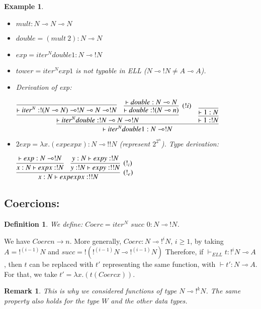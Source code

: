 \documentclass[a4paper,10pt]{article}
\newcommand{\limpl}{\multimap}  %
\newtheorem{definition}{Definition}
\newtheorem{ex}{Example}
\newtheorem{rmk}{Remark}
\begin{document}
\begin{ex}
\begin{itemize}
\item $mult: N \limpl N \limpl N$
\item $double=(mult\ 2): N \limpl N$
\item $exp=iter^N double 1: N \limpl !N$
\item $tower=iter^N exp 1$ is not typable in ELL ($N\limpl !N \neq A\limpl A$).
\item Derivation of exp:
\begin{center}
$	\infer{\vdash iter^N double 1: N \limpl !N}{
		\infer{\vdash iter^N double: !N \limpl N \limpl !N}{
			\infer{\vdash iter^N: !(N\limpl N) \limpl !N \limpl N \limpl !N}{}
			&
			\infer[(!i)]{\vdash double:!(N\limpl n)}{\vdash double:N\limpl N}
		}
		&
		\infer{\vdash 1:!N}{\infer{\vdash 1:N}{}}
	}$
\end{center}

\item $2exp= \lambda x.(exp exp x): N \limpl !!N$ (represent $2^{2^{n}}$). Type derivation:
\begin{center}
$	\infer[(!_e)]{x:N \vdash exp exp x: !!N}{
		\infer{x:N \vdash exp x: !N}{\vdash exp:N \limpl !N}
		&
		\infer[(!_i)]{y:!N \vdash exp y:!!N}{y:N \vdash exp y:!N}
	}$
\end{center}
\end{itemize}

\end{ex}


\subsection{Coercions:}
\begin{definition}
We define: $Coerc = iter^N$ $succ$ $0: N \limpl !N$.
\end{definition}

 We have $Coerc n \rightarrow n$.
 More generally, $Coerc: N \limpl !^i N$, $i\geq 1$, by taking $A=!^{(i-1)} N$ and $succ=!(!^{(i-1)} N \limpl !^{(i-1)} N)$
 Therefore, if $\vdash_{ELL} t: !^{i} N \limpl A$, then $t$ can be replaced with $t'$ representing the same function, with $\vdash t':N \limpl A$. For that, we take $t' = \lambda x.(t (Coerc x))$.

\begin{rmk}
This is why we considered functions of type $N \limpl !^k N$. The same property also holds for the type $W$ and the other data types.
\end{rmk}
\end{document}
